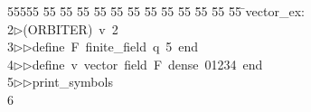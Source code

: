 %
%
\begin{tabbing}
55555 \= 55 \= 55 \= 55 \= 55 \= 55 \= 55 \= 55 \= 55 \= 55 \= 55 \= 55 \= 55 \= \>vector\_ex:\\[0pt]
2\>$\triangleright$\>(ORBITER)\ v\ 2\ \\[0pt]
3\>$\triangleright$\>$\triangleright$\>define\ F\ finite\_field\ q\ 5\ end\ \\[0pt]
4\>$\triangleright$\>$\triangleright$\>define\ v\ vector\ field\ F\ dense\ 01234\ end\ \\[0pt]
5\>$\triangleright$\>$\triangleright$\>print\_symbols\\[0pt]
6\>\end{tabbing}
